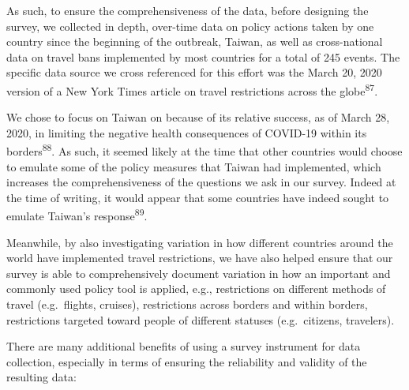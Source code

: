\documentclass[]{article}
\begin{document}
As such, to ensure the comprehensiveness of the data, before designing the survey, we collected in depth, over-time data on policy actions taken by one country since the beginning of the outbreak, Taiwan, as well as cross-national data on travel bans implemented by most countries for a total of 245 events. The specific data source we cross referenced for this effort was the March 20, 2020 version of a New York Times article on travel restrictions across the globe\textsuperscript{87}.

We chose to focus on Taiwan on because of its relative success, as of March 28, 2020, in limiting the negative health consequences of COVID-19 within its borders\textsuperscript{88}. As such, it seemed likely at the time that other countries would choose to emulate some of the policy measures that Taiwan had implemented, which increases the comprehensiveness of the questions we ask in our survey. Indeed at the time of writing, it would appear that some countries have indeed sought to emulate Taiwan's response\textsuperscript{89}.

Meanwhile, by also investigating variation in how different countries around the world have implemented travel restrictions, we have also helped ensure that our survey is able to comprehensively document variation in how an important and commonly used policy tool is applied, e.g., restrictions on different methods of travel (e.g.~flights, cruises), restrictions across borders and within borders, restrictions targeted toward people of different statuses (e.g.~citizens, travelers).

There are many additional benefits of using a survey instrument for data collection, especially in terms of ensuring the reliability and validity of the resulting data:
\end{document}
